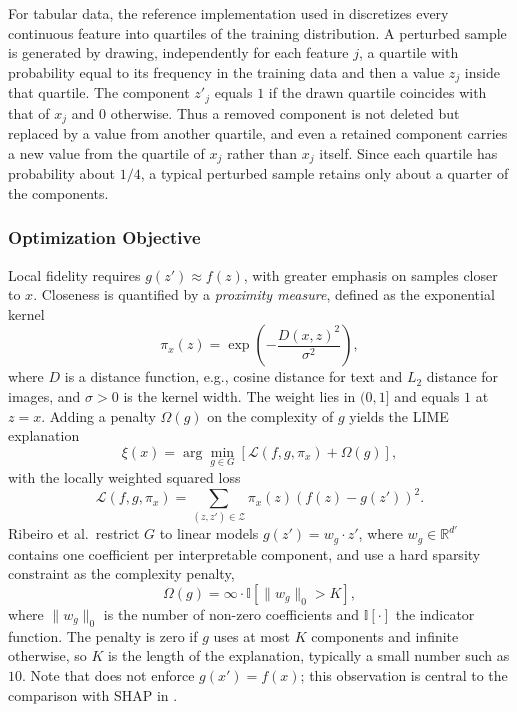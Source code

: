     For tabular data, the reference implementation used in  discretizes every continuous feature into quartiles of the training distribution. A perturbed sample is generated by drawing, independently for each feature $j$, a quartile with probability equal to its frequency in the training data and then a value $z_j$ inside that quartile. The component $z'_j$ equals $1$ if the drawn quartile coincides with that of $x_j$ and $0$ otherwise. Thus a removed component is not deleted but replaced by a value from another quartile, and even a retained component carries a new value from the quartile of $x_j$ rather than $x_j$ itself. Since each quartile has probability about $1/4$, a typical perturbed sample retains only about a quarter of the components.

    \subsubsection{Optimization Objective}
    Local fidelity requires $g(z') \approx f(z)$, with greater emphasis on samples closer to $x$. Closeness is quantified by a \textit{proximity measure}, defined as the exponential kernel
    \begin{equation}
        \pi_x(z) = \exp\left( - \frac{D(x, z)^2}{\sigma^2} \right),
        \label{eq:lime-kernel}
    \end{equation}
    where $D$ is a distance function, e.g., cosine distance for text and $L_2$ distance for images, and $\sigma > 0$ is the kernel width. The weight lies in $(0, 1]$ and equals $1$ at $z = x$. Adding a penalty $\Omega(g)$ on the complexity of $g$ yields the LIME explanation
    \begin{equation}
        \xi(x) = \arg\min_{g \in G} \left[ \mathcal{L}(f, g, \pi_x) + \Omega(g) \right],
        \label{eq:lime-objective}
    \end{equation}
    with the locally weighted squared loss
    \begin{equation}
        \mathcal{L}(f, g, \pi_x) = \sum_{(z, z') \in \mathcal{Z}} \pi_x(z) \left( f(z) - g(z') \right)^2 .
        \label{eq:lime-loss}
    \end{equation}
    Ribeiro et al.\ restrict $G$ to linear models $g(z') = w_g \cdot z'$, where $w_g \in \mathbb{R}^{d'}$ contains one coefficient per interpretable component, and use a hard sparsity constraint as the complexity penalty,
    \begin{equation}
        \Omega(g) = \infty \cdot \mathbb{I}\left[ \|w_g\|_0 > K \right],
        \label{eq:lime-omega}
    \end{equation}
    where $\|w_g\|_0$ is the number of non-zero coefficients and $\mathbb{I}[\cdot]$ the indicator function. The penalty is zero if $g$ uses at most $K$ components and infinite otherwise, so $K$ is the length of the explanation, typically a small number such as $10$. Note that  does not enforce $g(x') = f(x)$; this observation is central to the comparison with SHAP in .

